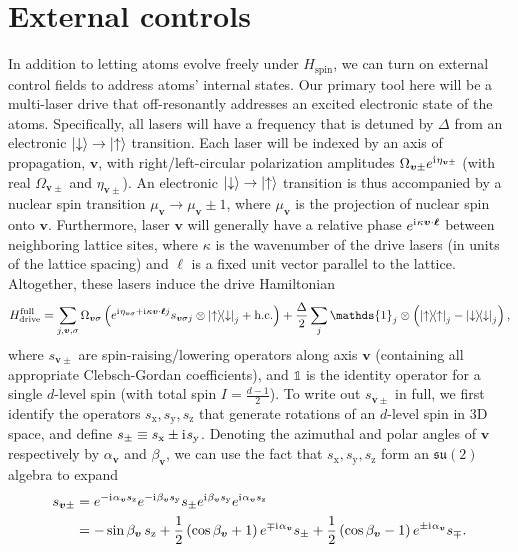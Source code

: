 \documentclass[nofootinbib,notitlepage,11pt]{revtex4-2}
\renewcommand{\t}{\text} %
\newcommand{\f}[2]{\dfrac{#1}{#2}} %
\newcommand{\p}[1]{\left(#1\right)} %
\renewcommand{\v}{\bm} %
\renewcommand{\c}{\cdot} %
\renewcommand{\i}{\mathrm{i}\mkern1mu} %
\newcommand{\1}{\mathds{1}}
\newcommand{\up}{\uparrow}
\newcommand{\dn}{\downarrow}
\newcommand{\x}{\text{x}}
\newcommand{\y}{\text{y}}
\newcommand{\z}{\text{z}}
\newcommand{\su}{\mathfrak{su}}
\begin{document}
\newpage
\appendix

\section{External controls}
\label{sec:controls}

In addition to letting atoms evolve freely under $H_{\t{spin}}$, we can turn on external control fields to address atoms' internal states.
Our primary tool here will be a multi-laser drive that off-resonantly addresses an excited electronic state of the atoms.
Specifically, all lasers will have a frequency that is detuned by $\Delta$ from an electronic $\ket\dn\to\ket\up$ transition.
Each laser will be indexed by an axis of propagation, $\v v$, with right/left-circular polarization amplitudes $\Omega_{\v v\pm} e^{\i\eta_{\v v\pm}}$ (with real $\Omega_{\v v\pm}$ and $\eta_{\v v\pm}$).
An electronic $\ket\dn\to\ket\up$ transition is thus accompanied by a nuclear spin transition $\mu_{\v v}\to\mu_{\v v}\pm1$, where $\mu_{\v v}$ is the projection of nuclear spin onto $\v v$.
Furthermore, laser $\v v$ will generally have a relative phase $e^{\i\kappa\v v\c\v\ell}$ between neighboring lattice sites, where $\kappa$ is the wavenumber of the drive lasers (in units of the lattice spacing) and $\v\ell$ is a fixed unit vector parallel to the lattice.
Altogether, these lasers induce the drive Hamiltonian
\begin{align}
  H_{\t{drive}}^{\t{full}} = \sum_{j,\v v,\sigma}
  \Omega_{\v v\sigma} \p{e^{\i\eta_{\v v\sigma} + \i\kappa\v v\c\v\ell j}
    s_{\v v\sigma j} \otimes \op{\up}{\dn}_j + \t{h.c.}}
  + \f{\Delta}{2} \sum_j \1_j \otimes\p{\op\up_j-\op\dn_j},
\end{align}
where $s_{\v v\pm}$ are spin-raising/lowering operators along axis $\v v$ (containing all appropriate Clebsch-Gordan coefficients), and $\1$ is the identity operator for a single $d$-level spin (with total spin $I=\frac{d-1}{2}$).
To write out $s_{\v v\pm}$ in full, we first identify the operators $s_\x,s_\y,s_\z$ that generate rotations of an $d$-level spin in 3D space, and define $s_\pm\equiv s_\x\pm\i s_\y$.
Denoting the azimuthal and polar angles of $\v v$ respectively by $\alpha_{\v v}$ and $\beta_{\v v}$, we can use the fact that $s_\x,s_\y,s_\z$ form an $\su(2)$ algebra to expand
\begin{align}
  s_{\v v\pm}
  &= e^{-\i\alpha_{\v v}s_\z} e^{-\i\beta_{\v v}s_\y}
  s_\pm e^{\i\beta_{\v v}s_\y} e^{\i\alpha_{\v v}s_\z} \\
  &= -\sin\beta_{\v v}\, s_\z
  + \f12 \p{\cos\beta_{\v v}+1} e^{\mp\i\alpha_{\v v}} s_\pm
  + \f12 \p{\cos\beta_{\v v}-1} e^{\pm\i\alpha_{\v v}} s_\mp.
\end{align}
\end{document}

